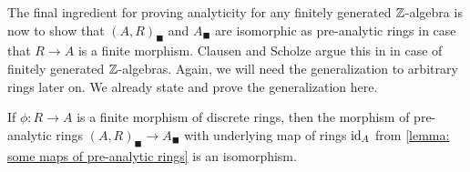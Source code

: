 The final ingredient for proving analyticity for any finitely generated ${\mathbb{Z}}$-algebra is now to show that $(A, R)_\blacksquare$ and $A_\blacksquare$ are isomorphic as pre-analytic rings in case that $R\to A$ is a finite morphism. Clausen and Scholze argue this in \eg \cite[Exposition to Lecture IX]{condenseddotpdf} in case of finitely generated ${\mathbb{Z}}$-algebras. Again, we will need the generalization to arbitrary rings later on. We already state and prove the generalization here.
\begin{lemma}
	\label{lemma: analytic rings associated to finite morphisms}
	
	If $\phi\colon R\to A$ is a finite morphism of discrete rings, then the morphism of pre-analytic rings $(A, R)_\blacksquare \to A_\blacksquare$ with underlying map of rings $\mathrm{id}_A$ from \ref{lemma: some maps of pre-analytic rings} is an isomorphism.
\end{lemma}
